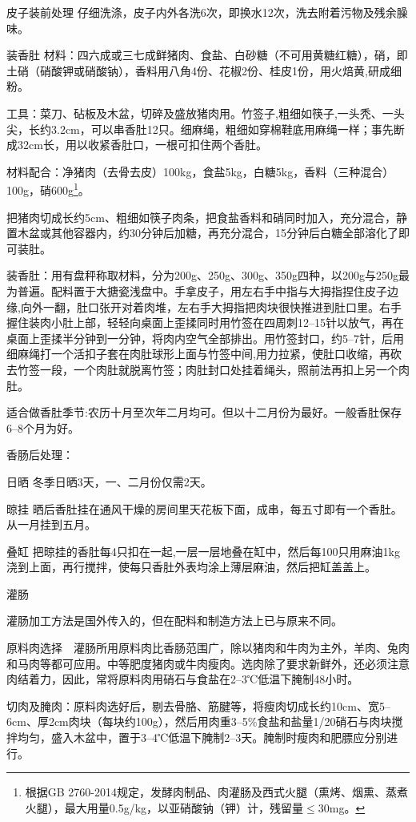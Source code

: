 \documentclass{ctexbook}
\begin{document}
皮子装前处理 仔细洗涤，皮子内外各洗6次，即换水12次，洗去附着污物及残余臊味。

装香肚
材料：四六成或三七成鲜猪肉、食盐、白砂糖（不可用黄糖红糖），硝，即土硝（硝酸钾或硝酸钠），香料用八角4份、花椒2份、桂皮1份，用火焙黄,研成细粉。

工具：菜刀、砧板及木盆，切碎及盛放猪肉用。竹签子,粗细如筷子,一头秃、一头尖，长约3.2cm，可以串香肚12只。细麻绳，粗细如穿棉鞋底用麻绳一样；事先断成32cm长，用以收紧香肚口，一根可扣住两个香肚。

材料配合：净猪肉（去骨去皮）100kg，食盐5kg，白糖5kg，香料（三种混合）100g，硝600g\footnote{根据GB 2760-2014规定，发酵肉制品、肉灌肠及西式火腿（熏烤、烟熏、蒸煮火腿），最大用量0.5g/kg，以亚硝酸钠（钾）计，残留量$\leq$30mg。}。

把猪肉切成长约5cm、粗细如筷子肉条，把食盐香料和硝同时加入，充分混合，静置木盆或其他容器内，约30分钟后加糖，再充分混合，15分钟后白糖全部溶化了即可装肚。

装香肚：用有盘秤称取材料，分为200g、250g、300g、350g四种，以200g与250g最为普遍。配料置于大搪瓷浅盘中。手拿皮子，用左右手中指与大拇指捏住皮子边缘,向外一翻，肚口张开对着肉堆，左右手大拇指把肉块很快推进到肚口里。右手握住装肉小肚上部，轻轻向桌面上歪揉同时用竹签在四周刺12--15针以放气，再在桌面上歪揉半分钟到一分钟，将肉内空气全部排出。用竹签封口，约5--7针，后用细麻绳打一个活扣子套在肉肚球形上面与竹签中间,用力拉紧，使肚口收缩，再砍去竹签一段，一个肉肚就脱离竹签；肉肚封口处挂着绳头，照前法再扣上另一个肉肚。

适合做香肚季节:农历十月至次年二月均可。但以十二月份为最好。一般香肚保存6--8个月为好。

香肠后处理：

日晒 冬季日晒3天，一、二月份仅需2天。

晾挂 晒后香肚挂在通风干燥的房间里天花板下面，成串，每五寸即有一个香肚。从一月挂到五月。

叠缸 把晾挂的香肚每4只扣在一起,一层一层地叠在缸中，然后每100只用麻油1kg浇到上面，再行搅拌，使每只香肚外表均涂上薄层麻油，然后把缸盖盖上。

灌肠

灌肠加工方法是国外传入的，但在配料和制造方法上已与原来不同。

原料肉选择　灌肠所用原料肉比香肠范围广，除以猪肉和牛肉为主外，羊肉、兔肉和马肉等都可应用。中等肥度猪肉或牛肉瘦肉。选肉除了要求新鲜外，还必须注意肉结着力，因此，常将原料肉用硝石与食盐在2--3℃低温下腌制48小时。

切肉及腌肉：原料肉选好后，剔去骨胳、筋腱等，将瘦肉切成长约10cm、宽5--6cm、厚2cm肉块（每块约100g），然后用肉重3--5\%食盐和盐量1/20硝石与肉块搅拌均匀，盛入木盆中，置于3--4℃低温下腌制2--3天。腌制时瘦肉和肥膘应分别进行。
\end{document}
